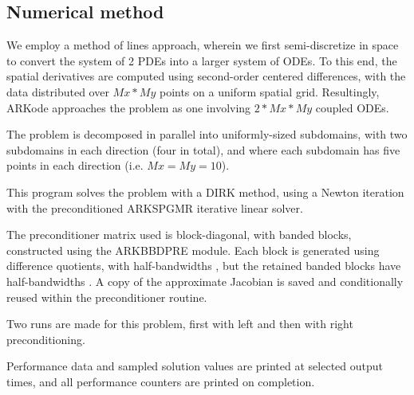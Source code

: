 \documentclass[letterpaper,10pt,english]{sphinxmanual}
\begin{document}
\subsection{Numerical method}
\label{c_parallel:numerical-method}
We employ a method of lines approach, wherein we first
semi-discretize in space to convert the system of 2 PDEs into a larger
system of ODEs.  To this end, the spatial derivatives are computed
using second-order centered differences, with the data distributed
over \(Mx*My\) points on a uniform spatial grid.  Resultingly, ARKode
approaches the problem as one involving \(2*Mx*My\) coupled ODEs.

The problem is decomposed in parallel into uniformly-sized subdomains,
with two subdomains in each direction (four in total), and where each
subdomain has five points in each direction (i.e. \(Mx=My=10\)).

This program solves the problem with a DIRK method, using a Newton
iteration with the preconditioned ARKSPGMR iterative linear solver.

The preconditioner matrix used is block-diagonal, with banded blocks,
constructed using the ARKBBDPRE module.  Each block is generated using
difference quotients, with half-bandwidths , but
the retained banded blocks have half-bandwidths .
A copy of the approximate Jacobian is saved and conditionally reused
within the preconditioner routine.

Two runs are made for this problem, first with left and then with
right preconditioning.

Performance data and sampled solution values are printed at
selected output times, and all performance counters are printed
on completion.
\end{document}
